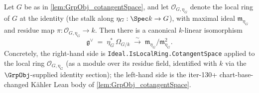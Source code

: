 \begin{lemma}
  \label{lem:GrpObj_cotangent_bridge}
  
  \notready
  Let \(G\) be as in \cref{lem:GrpObj_cotangentSpace}, and let \(\mathcal O_{G, \eta_G}\) denote the local ring of \(G\) at the identity (the stalk along \(\eta_G : \Spec k \to G\)), with maximal ideal \(\mathfrak m_{\eta_G}\) and residue map \(\pi \colon \mathcal O_{G, \eta_G} \to k\). Then there is a canonical \(k\)-linear isomorphism
  \[
    \mathfrak g^{\vee} \;=\; \eta_G^{*}\,\Omega_{G/k}
    \;\xrightarrow{\;\sim\;}\;
    \mathfrak m_{\eta_G} \big/ \mathfrak m_{\eta_G}^{2}.
  \]
  Concretely, the right-hand side is \texttt{Ideal.IsLocalRing.CotangentSpace} applied to the local ring \(\mathcal O_{G, \eta_G}\) (as a module over its residue field, identified with \(k\) via the \(\GrpObj\)-supplied identity section); the left-hand side is the iter-130+ chart-base-changed Kähler Lean body of \cref{lem:GrpObj_cotangentSpace}.
\end{lemma}

